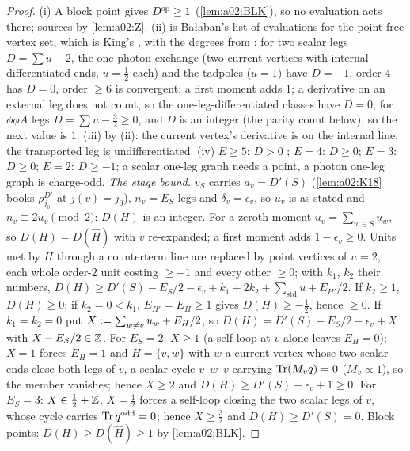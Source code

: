 \begin{proof}
(i) A block point gives $D^{\mathrm{sp}}\ge1$ (\cref{lem:a02:BLK}), so no evaluation acts there; sources by \cref{lem:a02:Z}. (ii) is Ba{\l}aban's list of evaluations \cite[pp.~429--445]{Ba3} for the point-free vertex set, which is King's \cite[(3.18), (3.19), (3.22), (3.23)]{K1}, with the degrees from \cite[(3.30)--(3.31)]{K1}: for two scalar legs $D=\sum u-2$, the one-photon exchange (two current vertices with internal differentiated ends, $u=\frac12$ each) and the tadpoles ($u=1$) have $D=-1$, order $4$ has $D=0$, order $\ge6$ is convergent; a first moment adds $1$; a derivative on an external leg does not count, so the one-leg-differentiated classes have $D=0$; for $\phi\phi A$ legs $D=\sum u-\frac32\ge0$, and $D$ is an integer (the parity count below), so the next value is $1$. (iii) by (ii): the current vertex's derivative is on the internal line, the transported leg is undifferentiated. (iv) $E\ge5$: $D>0$ \cite[(2.17)]{Ba3}; $E=4$: $D\ge0$; $E=3$: $D\ge0$; $E=2$: $D\ge-1$; a scalar one-leg graph needs a point, a photon one-leg graph is charge-odd. \emph{The stage bound.} $v_S$ carries $a_v=D'(S)$ (\cref{lem:a02:K18} books $\rho_{j_0}^{D'}$ at $j(v)=j_0$), $n_v=E_S$ legs and $\delta_v=\epsilon_v$, so $u_v$ is as stated and $n_v\equiv2u_v\pmod2$: $D(H)$ is an integer. For a zeroth moment $u_v=\sum_{w\in S}u_w$, so $D(H)=D(\hat H)$ with $v$ re-expanded; a first moment adds $1-\epsilon_v\ge0$. Units met by $H$ through a counterterm line are replaced by point vertices of $u=2$, each whole order-$2$ unit costing $\ge-1$ and every other $\ge0$; with $k_1$, $k_2$ their numbers, $D(H)\ge D'(S)-E_S/2-\epsilon_v+k_1+2k_2+\sum_{\mathrm{std}}u+E_{H'}/2$. If $k_2\ge1$, $D(H)\ge0$; if $k_2=0<k_1$, $E_{H'}=E_H\ge1$ gives $D(H)\ge-\frac12$, hence $\ge0$. If $k_1=k_2=0$ put $X:=\sum_{w\ne v}u_w+E_H/2$, so $D(H)=D'(S)-E_S/2-\epsilon_v+X$ with $X-E_S/2\in\mathbb Z$. For $E_S=2$: $X\ge1$ (a self-loop at $v$ alone leaves $E_H=0$); $X=1$ forces $E_H=1$ and $H=\{v,w\}$ with $w$ a current vertex whose two scalar ends close both legs of $v$, a scalar cycle $v$--$w$--$v$ carrying $\operatorname{Tr}(M_vq)=0$ ($M_v\propto1$), so the member vanishes; hence $X\ge2$ and $D(H)\ge D'(S)-\epsilon_v+1\ge0$. For $E_S=3$: $X\in\frac12+\mathbb Z$, $X=\frac12$ forces a self-loop closing the two scalar legs of $v$, whose cycle carries $\operatorname{Tr} q^{\mathrm{odd}}=0$; hence $X\ge\frac32$ and $D(H)\ge D'(S)=0$. Block points: $D(H)\ge D(\hat H)\ge1$ by \cref{lem:a02:BLK}.
\end{proof}

